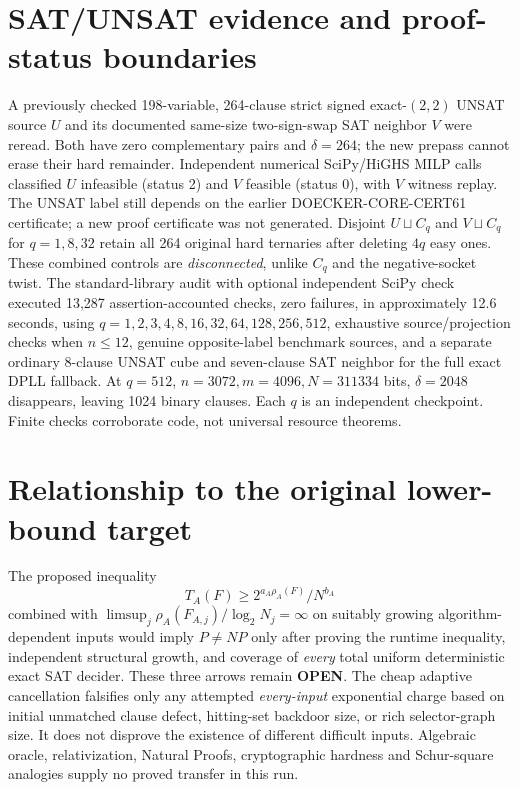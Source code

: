 \documentclass[11pt]{article}
\begin{document}
\section{SAT/UNSAT evidence and proof-status boundaries}
A previously checked 198-variable, 264-clause strict signed exact-$(2,2)$ UNSAT source $U$ and its documented same-size two-sign-swap SAT neighbor $V$ were reread. Both have zero complementary pairs and $\delta=264$; the new prepass cannot erase their hard remainder. Independent numerical SciPy/HiGHS MILP calls classified $U$ infeasible (status 2) and $V$ feasible (status 0), with $V$ witness replay. The UNSAT label still depends on the earlier DOECKER-CORE-CERT61 certificate; a new proof certificate was not generated. Disjoint $U\sqcup C_q$ and $V\sqcup C_q$ for $q=1,8,32$ retain all 264 original hard ternaries after deleting $4q$ easy ones. These combined controls are \emph{disconnected}, unlike $C_q$ and the negative-socket twist.
The standard-library audit with optional independent SciPy check executed 13,287 assertion-accounted checks, zero failures, in approximately 12.6 seconds, using $q=1,2,3,4,8,16,32,64,128,256,512$, exhaustive source/projection checks when $n\le12$, genuine opposite-label benchmark sources, and a separate ordinary 8-clause UNSAT cube and seven-clause SAT neighbor for the full exact DPLL fallback. At $q=512$, $n=3072,m=4096,N=311334$ bits, $\delta=2048$ disappears, leaving 1024 binary clauses. Each $q$ is an independent checkpoint. Finite checks corroborate code, not universal resource theorems.

\section{Relationship to the original lower-bound target}
The proposed inequality
\[
T_A(F)\ge 2^{a_A\rho_A(F)}/N^{b_A}
\]
combined with $\limsup_j\rho_A(F_{A,j})/\log_2N_j=\infty$ on suitably growing algorithm-dependent inputs would imply $P\ne NP$ only after proving the runtime inequality, independent structural growth, and coverage of \emph{every} total uniform deterministic exact SAT decider. These three arrows remain \textbf{OPEN}. The cheap adaptive cancellation falsifies only any attempted \emph{every-input} exponential charge based on initial unmatched clause defect, hitting-set backdoor size, or rich selector-graph size. It does not disprove the existence of different difficult inputs. Algebraic oracle, relativization, Natural Proofs, cryptographic hardness and Schur-square analogies supply no proved transfer in this run.
\end{document}
